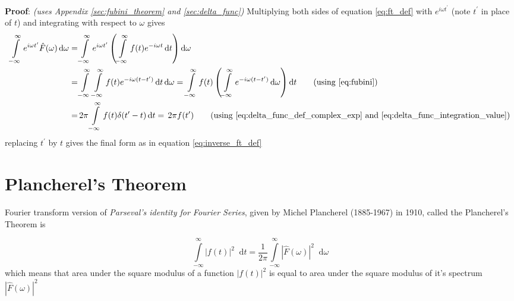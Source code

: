 \documentclass[11pt, a4paper]{article}
\let\oldsection\section
\renewcommand{\section}{%
	\setcounter{equation}{0}%
	\oldsection%
}
\newcommand{\quotedsingle}[1]{#1}	%
\newcommand{\quotedsingleit}[1]{\quotedsingle{\textit{#1}}}	%
\newcommand{\eqrefnp}[1]{\textup{\ref{#1}}}  %
\newcommand{\primed}[1]{#1^{\prime}}
\newcommand{\tp}{\primed{t}}	%
\newcommand{\diff}{\mathop{}\!\mathrm{d}}
\newcommand{\dt}{\diff t}
\newcommand{\domega}{\diff \omega}
\newcommand{\dint}[2]{\int \limits_{#1}^{#2}}  %
\newcommand{\intinfty}{\dint{-\infty}{\infty}}	%
\newcommand{\iintinfty}{\intinfty \intinfty}	%
\begin{document}
	\vspace{4pt}
	\textbf{Proof}: \textit{(uses Appendix \ref{sec:fubini_theorem} and \ref{sec:delta_func})} Multiplying both sides of equation \eqref{eq:ft_def} with $e^{i\omega \tp}$ (note $\tp$ in place of $t$) and integrating with respect to $\omega$ gives
	\begin{align*}
		\intinfty e^{i\omega \tp} \hat{F}(\omega) \domega 
		= & \intinfty e^{i\omega \tp} \left(\intinfty f(t) e^{-i\omega t} \dt \right) \domega \\
		= & \iintinfty f(t) e^{-i\omega (t - \tp)} \dt \domega
		= \intinfty f(t) \left(\intinfty  e^{-i\omega (t - \tp)} \domega \right) \dt \tag{using \eqrefnp{eq:fubini}} \\
		= & \, 2 \pi \intinfty f(t) \delta (\tp - t) \dt = \, 2 \pi f(\tp) \tag{using \eqrefnp{eq:delta_func_def_complex_exp} and \eqrefnp{eq:delta_func_integration_value}}
	\end{align*} 
	replacing $\tp$ by $t$ gives the final form as in equation \eqref{eq:inverse_ft_def}
	
	\section{Plancherel's Theorem}\label{sec:plancherel_theorem}
	Fourier transform version of \quotedsingleit{Parseval's identity for Fourier Series}, given by Michel Plancherel (1885-1967) in 1910, called the Plancherel's Theorem is \cite{herman2016fourieranalysis}
	
	\begin{equation}\label{eq:plancherel_theorem}
		\intinfty |f(t)|^{2} \dt = \frac{1}{2 \pi} \intinfty |\hat{F}(\omega)|^{2} \domega
	\end{equation}
	which means that area under the square modulus of a function $|f(t)|^{2}$ is equal to area under the square modulus of it's spectrum $|\hat{F}(\omega)|^{2}$
	
\end{document}
